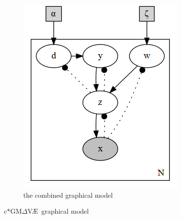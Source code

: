 \documentclass[final]{beamer}
\newcommand{\gmvae}{c$\ast$GM$\Delta$V\AE~}
\begin{document}
\begin{frame}
\begin{figure}[h]
\begin{subfigure}[b]{0.4\textwidth}
\includegraphics[width=\textwidth]{plots/dirichlet_gmm.gv.png}
\caption{the combined graphical model}
\end{subfigure}
\caption{\gmvae graphical model}
\label{fig:gmvae_model}
\end{figure}


\end{frame}
\end{document}
